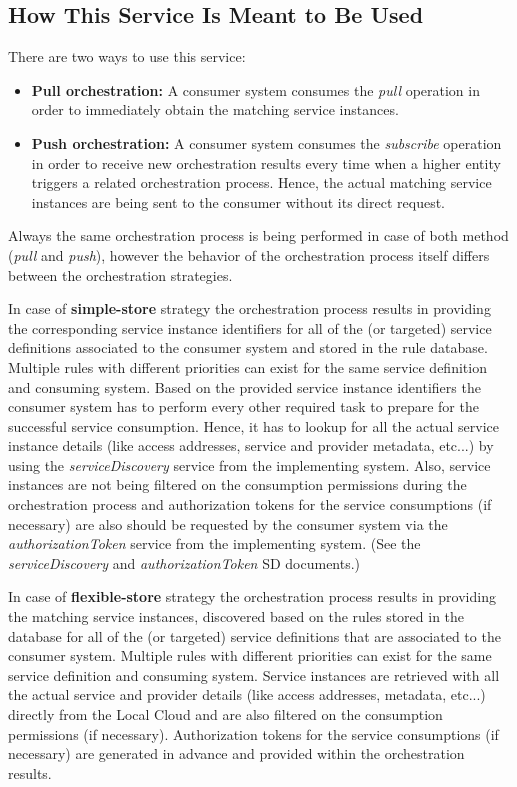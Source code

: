 \documentclass[a4paper]{arrowhead}
\begin{document}
\subsection{How This Service Is Meant to Be Used}

There are two ways to use this service:

\begin{itemize}
    \item \textbf{Pull orchestration:} A consumer system consumes the \textit{pull} operation in order to immediately obtain the matching service instances.
    \item \textbf{Push orchestration:} A consumer system consumes the \textit{subscribe} operation in order to receive new orchestration results every time when a higher entity triggers a related orchestration process. Hence, the actual matching service instances are being sent to the consumer without its direct request.
\end{itemize}

Always the same orchestration process is being performed in case of both method (\textit{pull} and \textit{push}), however the behavior of the orchestration process itself differs between the orchestration strategies.

In case of \textbf{simple-store} strategy the orchestration process results in providing the corresponding service instance identifiers for all of the (or targeted) service definitions associated to the consumer system and stored in the rule database. Multiple rules with different priorities can exist for the same service definition and consuming system. Based on the provided service instance identifiers the consumer system has to perform every other required task to prepare for the successful service consumption. Hence, it has to lookup for all the actual service instance details (like access addresses, service and provider metadata, etc...) by using the \textit{serviceDiscovery} service from the implementing system. Also, service instances are not being filtered on the consumption permissions during the orchestration process and authorization tokens for the service consumptions (if necessary) are also should be requested by the consumer system via the \textit{authorizationToken} service from the implementing system.
(See the \textit{serviceDiscovery} and \textit{authorizationToken} SD documents.)

In case of \textbf{flexible-store} strategy the orchestration process results in providing the matching service instances, discovered based on the rules stored in the database for all of the (or targeted) service definitions that are associated to the consumer system. Multiple rules with different priorities can exist for the same service definition and consuming system. Service instances are retrieved with all the actual service and provider details (like access addresses, metadata, etc...) directly from the Local Cloud and are also filtered on the consumption permissions (if necessary). Authorization tokens for the service consumptions (if necessary) are generated in advance and provided within the orchestration results. 
\end{document}

